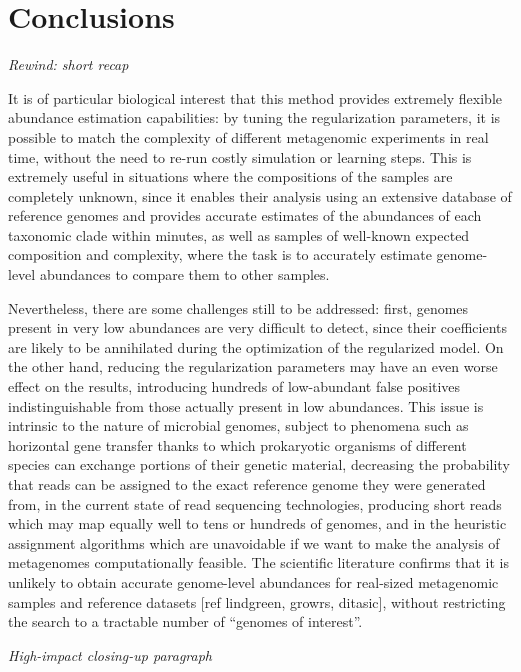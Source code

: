 
\chapter{Conclusions}
\label{Chapter5}

\textit{Rewind: short recap}

It is of particular biological interest that this method provides extremely flexible abundance estimation capabilities: by tuning the regularization parameters, it is possible to match the complexity of different metagenomic experiments in real time, without the need to re-run costly simulation or learning steps. This is extremely useful in situations where the compositions of the samples are completely unknown, since it enables their analysis using an extensive database of reference genomes and provides accurate estimates of the abundances of each taxonomic clade within minutes, as well as samples of well-known expected composition and complexity, where the task is to accurately estimate genome-level abundances to compare them to other samples.

Nevertheless, there are some challenges still to be addressed: first, genomes present in very low abundances are very difficult to detect, since their coefficients are likely to be annihilated during the optimization of the regularized model. On the other hand, reducing the regularization parameters may have an even worse effect on the results, introducing hundreds of low-abundant false positives indistinguishable from those actually present in low abundances. This issue is intrinsic to the nature of microbial genomes, subject to phenomena such as horizontal gene transfer thanks to which prokaryotic organisms of different species can exchange portions of their genetic material, decreasing the probability that reads can be assigned to the exact reference genome they were generated from, in the current state of read sequencing technologies, producing short reads which may map equally well to tens or hundreds of genomes, and in the heuristic assignment algorithms which are unavoidable if we want to make the analysis of metagenomes computationally feasible. The scientific literature confirms that it is unlikely to obtain accurate genome-level abundances for real-sized metagenomic samples and reference datasets [ref lindgreen, growrs, ditasic], without restricting the search to a tractable number of ``genomes of interest''.

\textit{High-impact closing-up paragraph}
